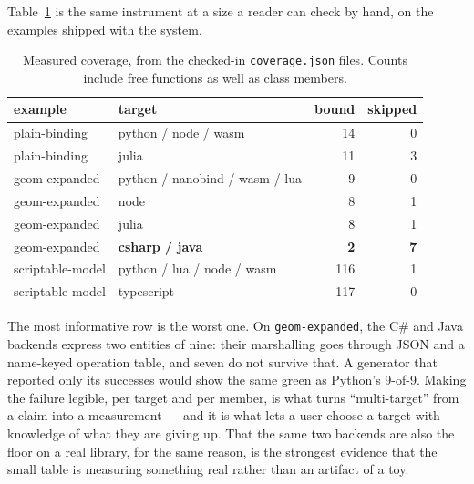 \documentclass[11pt,a4paper]{article}
\newcommand{\code}[1]{\texttt{\small #1}}
\begin{document}
Table~\ref{tab:coverage} is the same instrument at a size a reader can check by
hand, on the examples shipped with the system.

\begin{table}[h]
\centering\small
\begin{tabular}{llrr}
\toprule
example & target & bound & skipped \\
\midrule
plain-binding  & python / node / wasm & 14 & 0 \\
plain-binding  & julia                & 11 & 3 \\
geom-expanded  & python / nanobind / wasm / lua & 9 & 0 \\
geom-expanded  & node                 & 8 & 1 \\
geom-expanded  & julia                & 8 & 1 \\
geom-expanded  & \textbf{csharp / java} & \textbf{2} & \textbf{7} \\
scriptable-model & python / lua / node / wasm & 116 & 1 \\
scriptable-model & typescript          & 117 & 0 \\
\bottomrule
\end{tabular}
\caption{Measured coverage, from the checked-in \code{coverage.json} files.
Counts include free functions as well as class members.}
\label{tab:coverage}
\end{table}

The most informative row is the worst one. On \code{geom-expanded}, the C\# and
Java backends express two entities of nine: their marshalling goes through JSON
and a name-keyed operation table, and seven do not survive that. A generator
that reported only its successes would show the same green as Python's 9-of-9.
Making the failure legible, per target and per member, is what turns
``multi-target'' from a claim into a measurement --- and it is what lets a user
choose a target with knowledge of what they are giving up. That the same two
backends are also the floor on a real library, for the same reason, is the
strongest evidence that the small table is measuring something real rather than
an artifact of a toy.
\end{document}
